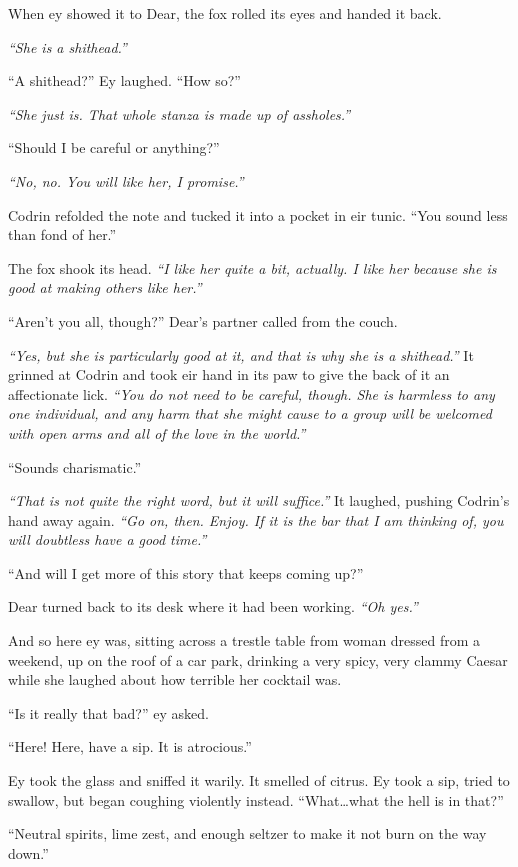 When ey showed it to Dear, the fox rolled its eyes and handed it back.

\emph{``She is a shithead.''}

``A shithead?'' Ey laughed. ``How so?''

\emph{``She just is. That whole stanza is made up of assholes.''}

``Should I be careful or anything?''

\emph{``No, no. You will like her, I promise.''}

Codrin refolded the note and tucked it into a pocket in eir tunic. ``You sound less than fond of her.''

The fox shook its head. \emph{``I like her quite a bit, actually. I like her because she is good at making others like her.''}

``Aren't you all, though?'' Dear's partner called from the couch.

\emph{``Yes, but she is particularly good at it, and that is why she is a shithead.''} It grinned at Codrin and took eir hand in its paw to give the back of it an affectionate lick. \emph{``You do not need to be careful, though. She is harmless to any one individual, and any harm that she might cause to a group will be welcomed with open arms and all of the love in the world.''}

``Sounds charismatic.''

\emph{``That is not quite the right word, but it will suffice.''} It laughed, pushing Codrin's hand away again. \emph{``Go on, then. Enjoy. If it is the bar that I am thinking of, you will doubtless have a good time.''}

``And will I get more of this story that keeps coming up?''

Dear turned back to its desk where it had been working. \emph{``Oh yes.''}

And so here ey was, sitting across a trestle table from woman dressed from a weekend, up on the roof of a car park, drinking a very spicy, very clammy Caesar while she laughed about how terrible her cocktail was.

``Is it really that bad?'' ey asked.

``Here! Here, have a sip. It is atrocious.''

Ey took the glass and sniffed it warily. It smelled of citrus. Ey took a sip, tried to swallow, but began coughing violently instead. ``What\ldots what the hell is in that?''

``Neutral spirits, lime zest, and enough seltzer to make it not burn on the way down.''

